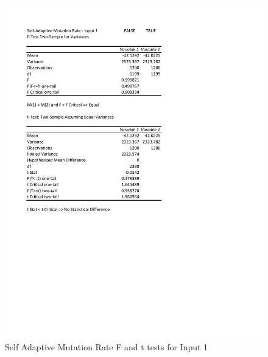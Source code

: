 \documentclass[times]{article}
\begin{document}
	\begin{figure}
		\caption{Self Adaptive Mutation Rate F and t tests for Input 1}
		\label{fig:saMutation1}
		\includegraphics[width=\textwidth]{./t_test/S-AMutationRate1}
	\end{figure}
\end{document}
